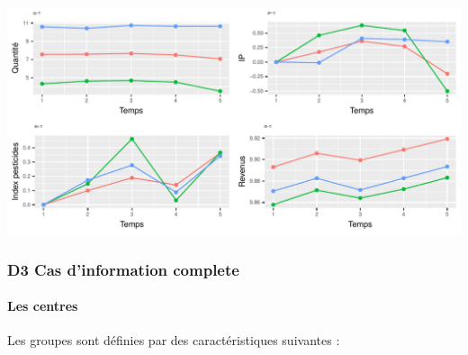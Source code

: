 \documentclass[11pt,]{article}
\let\oldparagraph\paragraph
\renewcommand{\paragraph}[1]{\oldparagraph{#1}\mbox{}}
\begin{document}
\begin{center}\includegraphics{note2pres_files/figure-latex/unnamed-chunk-97-1} \end{center}

\hypertarget{d3-cas-dinformation-complete}{%
\subsubsection{D3 Cas d'information
complete}\label{d3-cas-dinformation-complete}}

\hypertarget{les-centres-1}{%
\paragraph{Les centres}\label{les-centres-1}}

Les groupes sont définies par des caractéristiques suivantes :

\FloatBarrier
\end{document}
